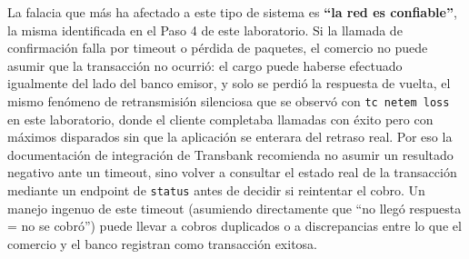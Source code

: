 La falacia que más ha afectado a este tipo de sistema es \textbf{``la red es
confiable''}, la misma identificada en el Paso 4 de este laboratorio. Si la
llamada de confirmación falla por timeout o pérdida de paquetes, el comercio
no puede asumir que la transacción no ocurrió: el cargo puede haberse
efectuado igualmente del lado del banco emisor, y solo se perdió la
respuesta de vuelta, el mismo fenómeno de retransmisión silenciosa que se
observó con \texttt{tc netem loss} en este laboratorio, donde el cliente
completaba llamadas con éxito pero con máximos disparados sin que la
aplicación se enterara del retraso real. Por eso la documentación de
integración de Transbank recomienda no asumir un resultado negativo ante un
timeout, sino volver a consultar el estado real de la transacción mediante
un endpoint de \texttt{status} antes de decidir si reintentar el cobro.
Un manejo ingenuo de este timeout (asumiendo directamente que ``no llegó
respuesta = no se cobró'') puede llevar a cobros duplicados o a discrepancias
entre lo que el comercio y el banco registran como transacción exitosa.